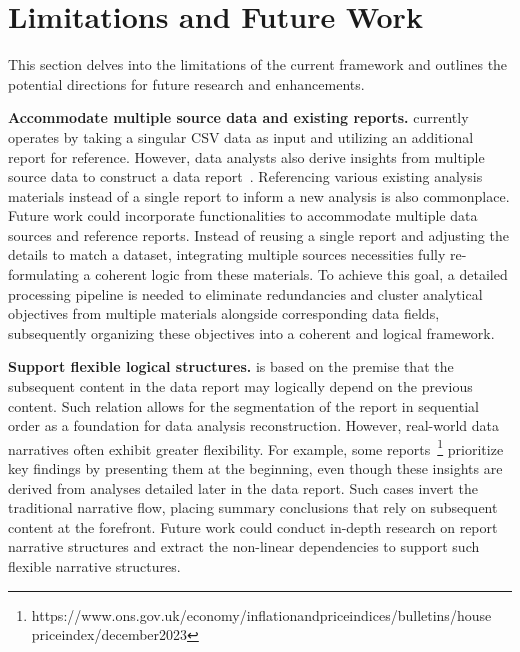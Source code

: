 \section{Limitations and Future Work}
This section delves into the limitations of the current \system{} framework and outlines the potential directions for future research and enhancements. 

\textbf{Accommodate multiple source data and existing reports. }
\system{} currently operates by taking a singular CSV data as input and utilizing an additional report for reference. 
However, data analysts also derive insights from multiple source data to construct a data report~\cite{li2023ai, cao2023dataparticles}. 
Referencing various existing analysis materials instead of a single report to inform a new analysis is also commonplace. 
Future work could incorporate functionalities to accommodate multiple data sources and reference reports. 
Instead of reusing a single report and adjusting the details to match a dataset, integrating multiple sources necessities fully re-formulating a coherent logic from these materials. 
To achieve this goal, a detailed processing pipeline is needed to eliminate redundancies and cluster analytical objectives from multiple materials alongside corresponding data fields, subsequently organizing these objectives into a coherent and logical framework. 

\textbf{Support flexible logical structures. }
\system{} is based on the premise that the subsequent content in the data report may logically depend on the previous content.
Such relation allows for the segmentation of the report in sequential order as a foundation for data analysis reconstruction. 
However, real-world data narratives often exhibit greater flexibility. 
For example, some reports~\footnote{https://www.ons.gov.uk/economy/inflationandpriceindices/bulletins/house\\priceindex/december2023} prioritize key findings by presenting them at the beginning, even though these insights are derived from analyses detailed later in the data report. 
Such cases invert the traditional narrative flow, placing summary conclusions that rely on subsequent content at the forefront. 
Future work could conduct in-depth research on report narrative structures and extract the non-linear dependencies to support such flexible narrative structures. 

